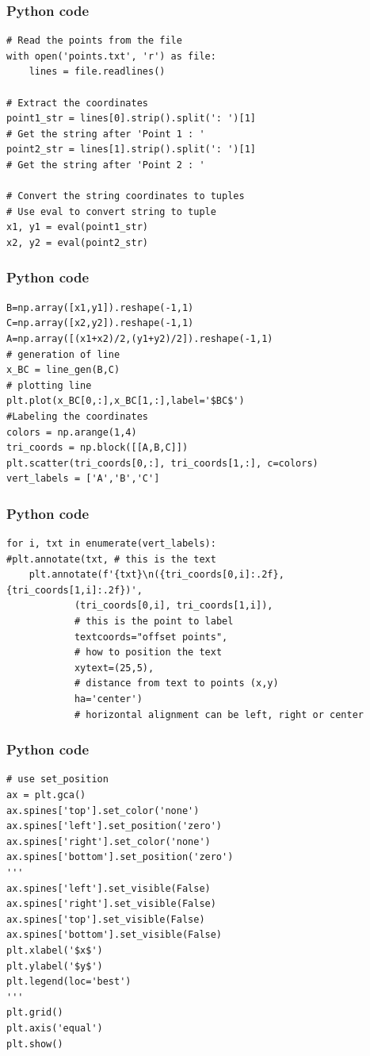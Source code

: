 \documentclass{beamer}
\begin{document}
\begin{frame}[fragile]
\frametitle{Python code}
\begin{verbatim}
# Read the points from the file
with open('points.txt', 'r') as file:
    lines = file.readlines()

# Extract the coordinates
point1_str = lines[0].strip().split(': ')[1]  
# Get the string after 'Point 1 : '
point2_str = lines[1].strip().split(': ')[1]  
# Get the string after 'Point 2 : '

# Convert the string coordinates to tuples
# Use eval to convert string to tuple
x1, y1 = eval(point1_str)  
x2, y2 = eval(point2_str)
\end{verbatim}
\end{frame}
\begin{frame}[fragile]
\frametitle{Python code}
\begin{verbatim}
B=np.array([x1,y1]).reshape(-1,1)
C=np.array([x2,y2]).reshape(-1,1)
A=np.array([(x1+x2)/2,(y1+y2)/2]).reshape(-1,1)
# generation of line
x_BC = line_gen(B,C)
# plotting line
plt.plot(x_BC[0,:],x_BC[1,:],label='$BC$')
#Labeling the coordinates
colors = np.arange(1,4)
tri_coords = np.block([[A,B,C]])
plt.scatter(tri_coords[0,:], tri_coords[1,:], c=colors)
vert_labels = ['A','B','C']
\end{verbatim}
\end{frame}
\begin{frame}[fragile]
\frametitle{Python code}
\begin{verbatim}
for i, txt in enumerate(vert_labels):
#plt.annotate(txt, # this is the text
    plt.annotate(f'{txt}\n({tri_coords[0,i]:.2f},{tri_coords[1,i]:.2f})',
            (tri_coords[0,i], tri_coords[1,i]), 
            # this is the point to label
            textcoords="offset points", 
            # how to position the text
            xytext=(25,5), 
            # distance from text to points (x,y)
            ha='center') 
            # horizontal alignment can be left, right or center

\end{verbatim}
\end{frame}
\begin{frame}[fragile]
\frametitle{Python code}
\begin{verbatim}
# use set_position
ax = plt.gca()
ax.spines['top'].set_color('none')
ax.spines['left'].set_position('zero')
ax.spines['right'].set_color('none')
ax.spines['bottom'].set_position('zero')
'''
ax.spines['left'].set_visible(False)
ax.spines['right'].set_visible(False)
ax.spines['top'].set_visible(False)
ax.spines['bottom'].set_visible(False)
plt.xlabel('$x$')
plt.ylabel('$y$')
plt.legend(loc='best')
'''
plt.grid()
plt.axis('equal')
plt.show()
\end{verbatim}
\end{frame}
\end{document}
